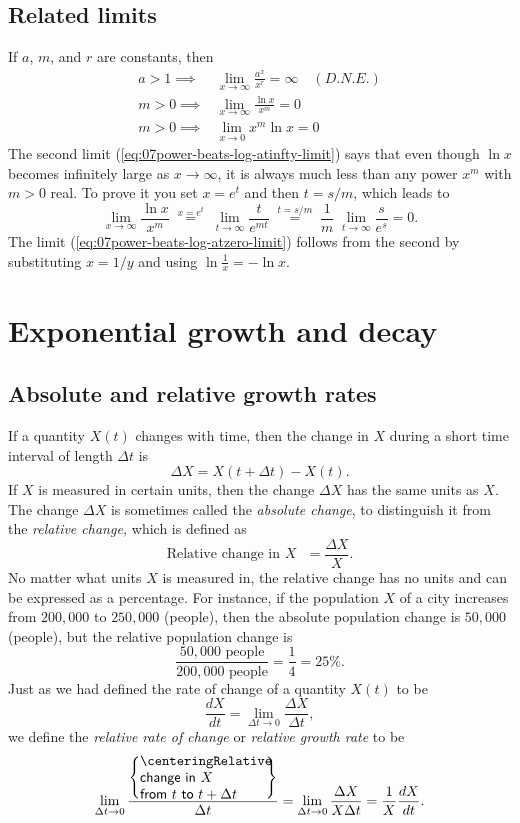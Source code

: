 \subsection{Related limits}
If $a$, $m$, and $r$ are constants, then
\begin{subequations}
  \begin{align}
    a>1 \implies &
    \lim_{x \to\infty} \frac{a^x}{x^r} = \infty \quad(D.N.E.)
    \label{eq:07exp-beats-power-limit}\\
    m>0 \implies & \lim_{x \to\infty} \frac{\ln x}{x^m} =0
        \label{eq:07power-beats-log-atinfty-limit}\\
    m>0 \implies & \lim_{x \to 0} x^m\ln x =0
        \label{eq:07power-beats-log-atzero-limit}
  \end{align}
\end{subequations}
The second limit (\ref{eq:07power-beats-log-atinfty-limit}) says that even
though $\ln x$ becomes infinitely large as $x \to\infty$, it is always much less
than any power $x^m$ with $m>0$ real.  To prove it you set $x=e^t$ and then
$t=s/m$, which leads to
\[
\lim_{x \to\infty} \frac{\ln x}{x^m}
\;\stackrel{x=e^t}{=}\;
\lim_{t \to\infty} \frac{t}{e^{mt}}
\;\stackrel{t = s/m}{=}\;
\frac1m\;\lim_{t \to\infty}\frac{s}{e^s} = 0.
\]
The limit (\ref{eq:07power-beats-log-atzero-limit}) follows from the second by
substituting $x=1/y$ and using $\ln\frac1x = -\ln x$.

\section{Exponential growth and decay}
\subsection{Absolute and relative growth rates}
If a quantity $X(t)$ changes with time, then the change in $X$ during a short
time interval of length $\Delta t$ is
\[
\Delta X = X(t+\Delta t) - X(t).
\]
If $X$ is measured in certain units, then the change $\Delta X$ has
the same units as $X$.  The change $\Delta X$ is sometimes called the
\emph{absolute change}, to distinguish it from the \emph{relative
  change,} which is defined as
\[
\text{Relative change in $X$ }= \frac{\Delta X} {X}.
\]
No matter what units $X$ is measured in, the relative change has no
units and can be expressed as a percentage.  For instance, if the
population $X$ of a city increases from $200,000$ to $250,000$
(people), then the absolute population change is $50,000$ (people),
but the relative population change is
\[
\frac{50,000\text{ people}}
{200,000\text{ people}} =
\frac{1} {4} = 25\%.
\]
Just as we had defined the rate of change of a quantity $X(t)$ to be
\[
\frac{dX} {dt} = \lim_{\Delta t\to0} \frac{\Delta X} {\Delta t},
\]
we define the \emph{relative rate of change} or \emph{relative growth
  rate} to be
\[
\lim_{\Delta t \to 0}
\frac{\left\{
    \parbox{90pt}{\sffamily\centering%
      Relative change in $X$\\
      from $t$ to $t+\Delta t$ }
  \right\}} {\Delta t}
= \lim_{\Delta t \to 0} \frac{\Delta X} {X \Delta t}
= \frac{1} {X}\frac{dX} {dt}.
\]

